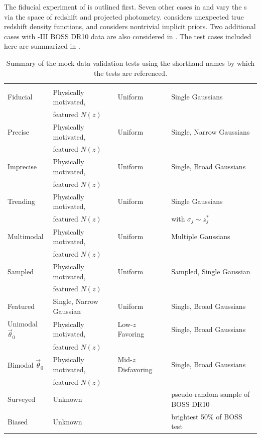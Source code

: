 The fiducial experiment of  is outlined first. 
Seven other cases in  and  vary the \pzpdf s via the space of redshift and projected photometry.
 considers unexpected true redshift density functions, and  considers nontrivial implicit priors.  
Two additional cases with \sdss-III BOSS DR10 data are also considered in .
The test cases included here are summarized in .

\begin{table}
	\begin{tabular}{llll}
		\textul{Title} & \textul{True $n(z)$} & \textul{Implicit Prior} & 
		\textul{Probability space}\\
		Fiducial & Physically motivated, & Uniform & Single Gaussians\\
		& featured $N(z)$ &&\\
		Precise & Physically motivated, & Uniform & Single, Narrow Gaussians\\
		& featured $N(z)$ &&\\
		Imprecise & Physically motivated, & Uniform & Single, Broad Gaussians\\
		& featured $N(z)$ &&\\
		Trending & Physically motivated, & Uniform & Single Gaussians\\
		& featured $N(z)$ && with $\sigma_{j}\sim z^{*}_{j}$\\
		Multimodal & Physically motivated, & Uniform & Multiple Gaussians\\
		& featured $N(z)$ &&\\
		Sampled & Physically motivated, & Uniform & Sampled, Single Gaussian\\
		& featured $N(z)$ &&\\
		Featured & Single, Narrow Gaussian & Uniform & Single, Broad Gaussians\\
		Unimodal $\vec{\theta}_{0}$ & Physically motivated, & Low-$z$ Favoring & 
		Single, Broad Gaussians\\
		& featured $N(z)$ &&\\
		Bimodal $\vec{\theta}_{0}$& Physically motivated, & Mid-$z$ Disfavoring & 
		Single, Broad Gaussians\\
		& featured $N(z)$ &&\\
		Surveyed & Unknown & \citet{Sheldon2012} & pseudo-random sample of BOSS DR10\\
		Biased & Unknown & \citet{Sheldon2012} & brightest 50\% of BOSS test
	\end{tabular}
	\caption{Summary of the mock data validation tests using the shorthand names by which the tests are referenced.}
\end{table}

